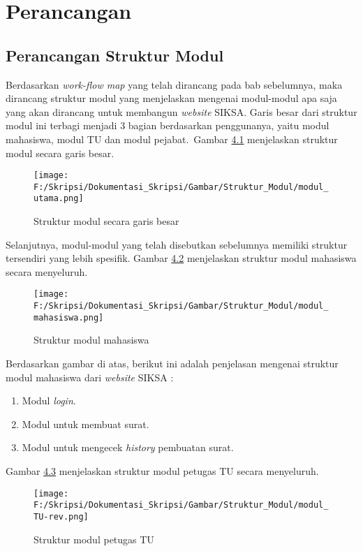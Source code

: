 \chapter{Perancangan}
\label{chap:perancangan}

\section{Perancangan Struktur Modul}
\label{sec:perancangan_struktur_modul}
Berdasarkan \textit{work-flow map} yang telah dirancang pada bab sebelumnya, maka dirancang struktur modul yang menjelaskan mengenai modul-modul apa saja yang akan dirancang untuk membangun \textit{website} SIKSA. Garis besar dari struktur modul ini terbagi menjadi 3 bagian berdasarkan penggunanya, yaitu modul mahasiswa, modul TU dan modul pejabat.\
Gambar \hyperlink{struktur_modul_garis_besar}{4.1} menjelaskan struktur modul secara garis besar.

\begin{figure}[H]
	\centering
		\texttt{[image: F:/Skripsi/Dokumentasi\_Skripsi/Gambar/Struktur\_Modul/modul\_utama.png]}
	\caption{Struktur modul secara garis besar}
	\label{fig:struktur_modul_garis_besar}
\end{figure}

Selanjutnya, modul-modul yang telah disebutkan sebelumnya memiliki struktur tersendiri yang lebih spesifik. Gambar \hyperlink{struktur_modul_mahasiswa}{4.2} menjelaskan struktur modul mahasiswa secara menyeluruh.

\begin{figure}[H]
	\centering
		\texttt{[image: F:/Skripsi/Dokumentasi\_Skripsi/Gambar/Struktur\_Modul/modul\_mahasiswa.png]}
	\caption{Struktur modul mahasiswa}
	\label{fig:struktur_modul_mahasiswa}
\end{figure}

Berdasarkan gambar di atas, berikut ini adalah penjelasan mengenai struktur modul mahasiswa dari \textit{website} SIKSA :
\begin{enumerate}
	\item Modul \textit{login}.
	\item Modul untuk membuat surat.
	\item Modul untuk mengecek \textit{history} pembuatan surat.
\end{enumerate}

Gambar \hyperlink{struktur_modul_tu}{4.3} menjelaskan struktur modul petugas TU secara menyeluruh.

\begin{figure}[H]
	\centering
		\texttt{[image: F:/Skripsi/Dokumentasi\_Skripsi/Gambar/Struktur\_Modul/modul\_TU-rev.png]}
	\caption{Struktur modul petugas TU}
	\label{fig:struktur_modul_TU}
\end{figure}

